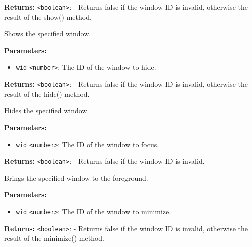 \documentclass[12pt,a4paper]{article}
\begin{document}
\noindent \textbf{Returns:} \texttt{<boolean>}: - Returns false if the window ID is invalid, otherwise the result of the show() method.

\noindent Shows the specified window.

\vspace{5mm}
\noindent {}


\noindent \textbf{Parameters:}
\begin{itemize}
  \item \texttt{wid} \texttt{<number>}: The ID of the window to hide.
\end{itemize}

\noindent \textbf{Returns:} \texttt{<boolean>}: - Returns false if the window ID is invalid, otherwise the result of the hide() method.

\noindent Hides the specified window.

\vspace{5mm}
\noindent {}


\noindent \textbf{Parameters:}
\begin{itemize}
  \item \texttt{wid} \texttt{<number>}: The ID of the window to focus.
\end{itemize}

\noindent \textbf{Returns:} \texttt{<boolean>}: - Returns false if the window ID is invalid.

\noindent Brings the specified window to the foreground.

\vspace{5mm}
\noindent {}


\noindent \textbf{Parameters:}
\begin{itemize}
  \item \texttt{wid} \texttt{<number>}: The ID of the window to minimize.
\end{itemize}

\noindent \textbf{Returns:} \texttt{<boolean>}: - Returns false if the window ID is invalid, otherwise the result of the minimize() method.
\end{document}

